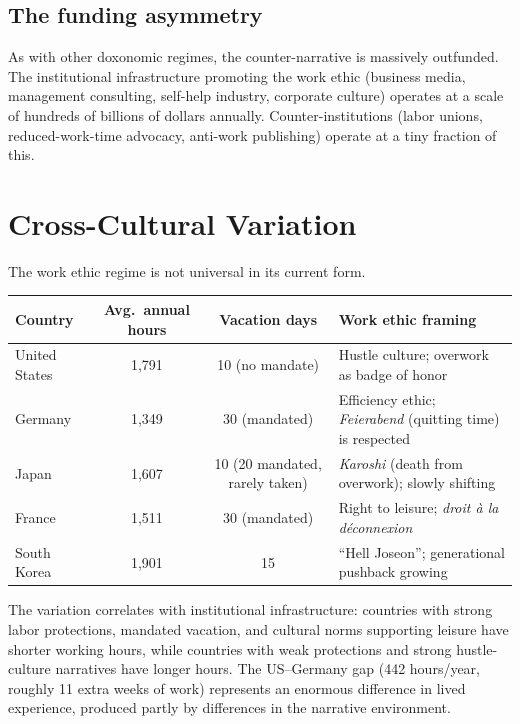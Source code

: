 \subsection{The funding asymmetry}

As with other doxonomic regimes, the counter-narrative is massively outfunded.
The institutional infrastructure promoting the work ethic (business media, management consulting, self-help industry, corporate culture) operates at a scale of hundreds of billions of dollars annually.
Counter-institutions (labor unions, reduced-work-time advocacy, anti-work publishing) operate at a tiny fraction of this.

\section{Cross-Cultural Variation}
\label{sec:ch26-cross-cultural}

The work ethic regime is not universal in its current form.

\begin{example}
\label{ex:work-culture-comparison}
\begin{center}
\begin{tabular}{p{2.5cm}ccp{4cm}}
\toprule
Country & Avg.\ annual hours & Vacation days & Work ethic framing \\
\midrule
United States & 1,791 & 10 (no mandate) & Hustle culture; overwork as badge of honor \\[4pt]
Germany & 1,349 & 30 (mandated) & Efficiency ethic; \emph{Feierabend} (quitting time) is respected \\[4pt]
Japan & 1,607 & 10 (20 mandated, rarely taken) & \emph{Karoshi} (death from overwork); slowly shifting \\[4pt]
France & 1,511 & 30 (mandated) & Right to leisure; \emph{droit \`{a} la d\'{e}connexion} \\[4pt]
South Korea & 1,901 & 15 & ``Hell Joseon''; generational pushback growing \\
\bottomrule
\end{tabular}
\end{center}

The variation correlates with institutional infrastructure: countries with strong labor protections, mandated vacation, and cultural norms supporting leisure have shorter working hours, while countries with weak protections and strong hustle-culture narratives have longer hours.
The US--Germany gap (442 hours/year, roughly 11 extra weeks of work) represents an enormous difference in lived experience, produced partly by differences in the narrative environment.
\end{example}

